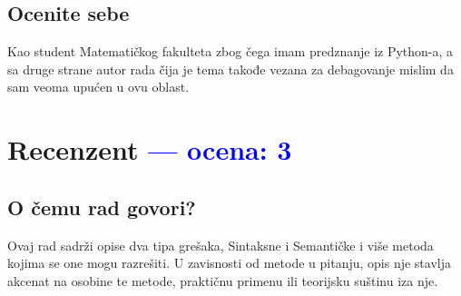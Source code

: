\documentclass[a4paper]{report}
\newcommand{\odgovor}[1]{\textcolor{blue}{#1}}
\begin{document}
\section{Ocenite sebe}

Kao student Matematičkog fakulteta zbog čega imam predznanje iz Python-a, a sa druge strane autor rada čija je tema takođe vezana za debagovanje mislim da sam veoma upućen u ovu oblast. 

\chapter{Recenzent \odgovor{--- ocena: 3} }


\section{O čemu rad govori?}
Ovaj rad sadrži opise dva tipa grešaka, Sintaksne i Semantičke i više metoda kojima se one mogu razrešiti. U zavisnosti od metode u pitanju, opis nje stavlja akcenat na osobine te metode, praktičnu primenu ili teorijsku suštinu iza nje. 
\end{document}
